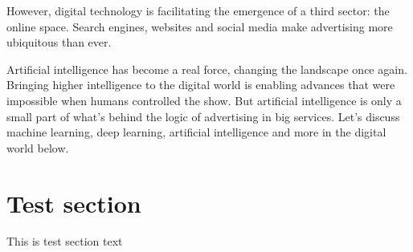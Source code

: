 \documentclass[10pt,twoside,a4paper,english]{article}
\begin{document}
	However, digital technology is facilitating the emergence of a third sector: the online space. Search engines, websites and social media make advertising more ubiquitous than ever. \par

	Artificial intelligence has become a real force, changing the landscape once again. Bringing higher intelligence to the digital world is enabling advances that were impossible when humans controlled the show. But artificial intelligence is only a small part of what's behind the logic of advertising in big services. Let's discuss machine learning, deep learning, artificial intelligence and more in the digital world below.\cite{10314235}\par

	\endgroup

	\section{Test section}
	\begingroup
		This is test section text \par

	\endgroup




	
\end{document}
